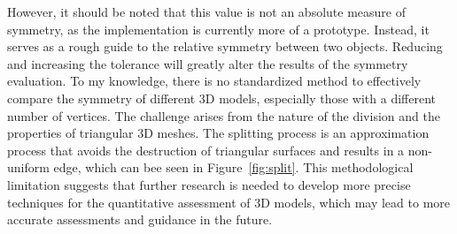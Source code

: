 However, it should be noted that this value is not an absolute measure of symmetry, as the implementation is currently more of a prototype. Instead, it serves as a rough guide to the relative symmetry between two objects. Reducing and increasing the tolerance will greatly alter the results of the symmetry evaluation. To my knowledge, there is no standardized method to effectively compare the symmetry of different 3D models, especially those with a different number of vertices. The challenge arises from the nature of the division and the properties of triangular 3D meshes. The splitting process is an approximation process that avoids the destruction of triangular surfaces and results in a non-uniform edge, which can bee seen in Figure~\ref{fig:split}. This methodological limitation suggests that further research is needed to develop more precise techniques for the quantitative assessment of 3D models, which may lead to more accurate assessments and guidance in the future.

